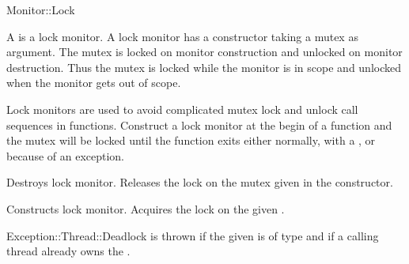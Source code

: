 
\begin{classpage}{Monitor::Lock}

A  is a lock monitor. A lock monitor has a
constructor taking a mutex as argument. The mutex is locked on monitor
construction and unlocked on monitor destruction. Thus the mutex is
locked while the monitor is in scope and unlocked when the monitor
gets out of scope.

Lock monitors are used to avoid complicated mutex lock and unlock call
sequences in functions. Construct a lock monitor at the begin of a
function and the mutex will be locked until the function exits either
normally, with a , or because of an exception.


\begin{mandescription}
  \destructor
  Destroys  lock monitor. Releases the lock on the mutex
  given in the constructor.

  Constructs  lock monitor. Acquires the lock on the given
  .
  \begin{exception}
    \item[Exception::Thread::Deadlock] is thrown if the given
       is of type  and if a calling
      thread already owns the .
  \end{exception}
\end{mandescription}

\end{classpage}


